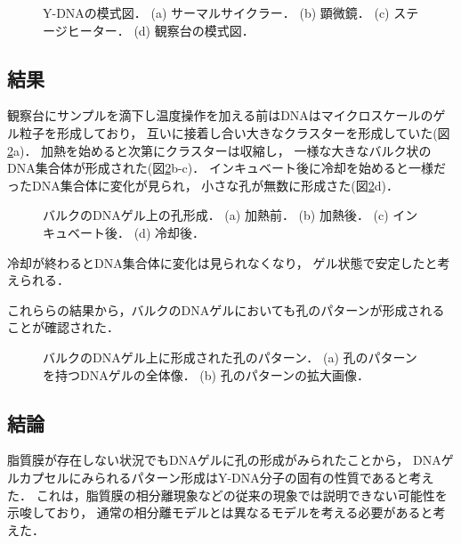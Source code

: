 \begin{figure}
\centering

\caption{Y-DNAの模式図．
    (a) サーマルサイクラー．
    (b) 顕微鏡．
    (c) ステージヒーター．
    (d) 観察台の模式図．
}

\label{fig:equipments}
\end{figure}


\subsection{結果}
観察台にサンプルを滴下し温度操作を加える前はDNAはマイクロスケールのゲル粒子を形成しており，
互いに接着し合い大きなクラスターを形成していた(図\ref{fig:result_dnagel_formation}a)．%
加熱を始めると次第にクラスターは収縮し，
一様な大きなバルク状のDNA集合体が形成された(図\ref{fig:result_dnagel_formation}b-c)．
インキュベート後に冷却を始めると一様だったDNA集合体に変化が見られ，
小さな孔が無数に形成さた(図\ref{fig:result_dnagel_formation}d)．

\begin{figure}
\centering

\caption{バルクのDNAゲル上の孔形成．
    (a) 加熱前．
    (b) 加熱後．
    (c) インキュベート後．
    (d) 冷却後．
}

\label{fig:result_dnagel_formation}
\end{figure}

冷却が終わるとDNA集合体に変化は見られなくなり，
ゲル状態で安定したと考えられる．

これららの結果から，バルクのDNAゲルにおいても孔のパターンが形成されることが確認された．

\begin{figure}
\centering

\caption{バルクのDNAゲル上に形成された孔のパターン．
    (a) 孔のパターンを持つDNAゲルの全体像．
    (b) 孔のパターンの拡大画像．
}

\label{fig:result_dnagel}
\end{figure}

\subsection{結論}
脂質膜が存在しない状況でもDNAゲルに孔の形成がみられたことから，
DNAゲルカプセルにみられるパターン形成はY-DNA分子の固有の性質であると考えた．
これは，脂質膜の相分離現象などの従来の現象では説明できない可能性を示唆しており，
通常の相分離モデルとは異なるモデルを考える必要があると考えた．

